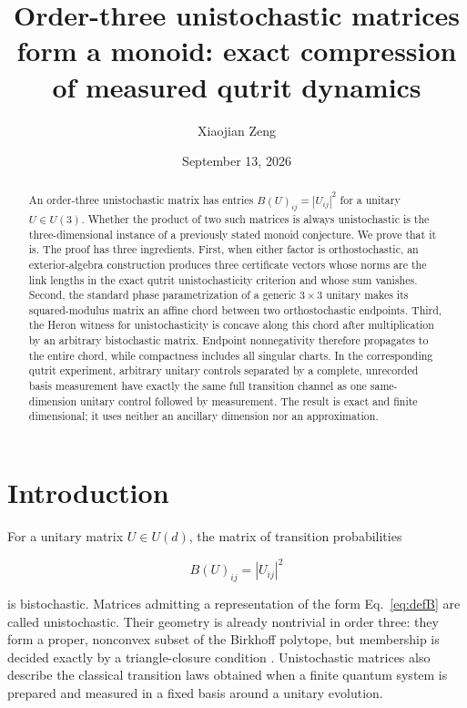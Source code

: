 \documentclass[aip,jmp,amsmath,amssymb,preprint,nofootinbib]{revtex4-2}
\begin{document}
\title{Order-three unistochastic matrices form a monoid: exact compression of measured qutrit dynamics}

\author{Xiaojian Zeng}
\date{September 13, 2026}

\begin{abstract}
An order-three unistochastic matrix has entries
$B(U)_{ij}=|U_{ij}|^2$ for a unitary $U\in U(3)$.  Whether the product of
two such matrices is always unistochastic is the three-dimensional instance
of a previously stated monoid conjecture.  We prove that it is.  The proof
has three ingredients.  First, when either factor is orthostochastic, an
exterior-algebra construction produces three certificate vectors whose norms
are the link lengths in the exact qutrit unistochasticity criterion and whose
sum vanishes.  Second, the standard phase parametrization of a generic
$3\times3$ unitary makes its squared-modulus matrix an affine chord between
two orthostochastic endpoints.  Third, the Heron witness for
unistochasticity is concave along this chord after multiplication by an
arbitrary bistochastic matrix.  Endpoint nonnegativity therefore propagates
to the entire chord, while compactness includes all singular charts.  In the
corresponding qutrit experiment, arbitrary unitary controls separated by a
complete, unrecorded basis measurement have exactly the same full transition
channel as one same-dimension unitary control followed by measurement.  The
result is exact and finite dimensional; it uses neither an ancillary
dimension nor an approximation.
\end{abstract}

\maketitle

\section{Introduction}

For a unitary matrix $U\in U(d)$, the matrix of transition probabilities

\begin{equation}
 B(U)_{ij}=|U_{ij}|^2
 \label{eq:defB}
\end{equation}

is bistochastic.  Matrices admitting a representation of the form
Eq.~\eqref{eq:defB} are called unistochastic.  Their geometry is already
nontrivial in order three: they form a proper, nonconvex subset of the
Birkhoff polytope, but membership is decided exactly by a triangle-closure
condition \cite{Bengtsson2005}.  Unistochastic matrices also describe the
classical transition laws obtained when a finite quantum system is prepared
and measured in a fixed basis around a unitary evolution.
\end{document}
